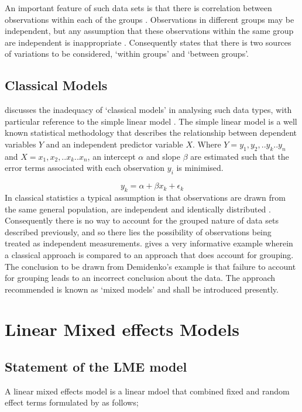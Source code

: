 \documentclass[12pt, a4paper]{report}
\theoremstyle{plain}
\theoremstyle{definition}
\theoremstyle{remark}
\begin{document}
An important feature of such data sets is that there is
correlation between observations within each of the groups
\citep{Faraway}. Observations in different groups may be
independent, but any assumption that these observations within the
same group are independent is inappropriate . Consequently
\citet{Demi} states that there is two sources of variations to be
considered, `within groups' and `between groups'.


\newpage
\section{Classical Models}
\citet{Demi} discusses the inadequacy of `classical models' in
analysing such data types, with particular reference to the simple
linear model . The simple linear model is a well known statistical
methodology that describes the relationship between dependent
variables $Y$ and an independent predictor variable $X$. Where
$Y={y_{1},y_{2},..y_{k}..y_{n}}$ and
$X={x_{1},x_{2},..x_{k}..x_{n}}$, an intercept $\alpha$ and slope
$\beta$ are estimated such that the error terms associated with
each observation $y_{i}$ is minimised.

\begin{equation}
y_{k} = \alpha + \beta x_{k}+ \epsilon_{k}
\end{equation}
In classical statistics a typical assumption is that observations
are drawn from the same general population, are independent and
identically distributed \citep{Demi}. Consequently there is no way
to account for the grouped nature of data sets described
previously, and so there lies the possibility of observations
being treated as independent measurements. \citet[pg.3]{Demi}
gives a very informative example wherein a classical approach is
compared to an approach that does account for grouping. The
conclusion to be drawn from Demidenko's example is that failure to
account for grouping leads to an incorrect conclusion about the
data. The approach recommended is known as `mixed models' and
shall be introduced presently.

\chapter{Linear Mixed effects Models}

\section{Statement of the LME model}
A linear mixed effects model is a linear mdoel that combined fixed and random effect terms formulated by \citet{LW82} as follows;
\end{document}
